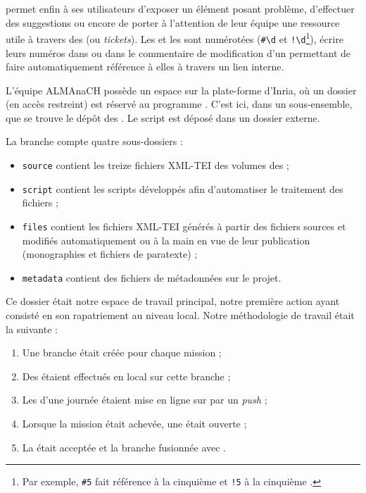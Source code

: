 \gitlab{} permet enfin à ses utilisateurs d'exposer un élément posant problème, d'effectuer des suggestions ou encore de porter à l'attention de leur équipe une ressource utile à travers des \issues{} (ou \textit{tickets}). Les \issues{} et les \mergerequests{} sont numérotées (\texttt{\#\textbackslash d} et \texttt{!\textbackslash d}\footnote{Par exemple, \texttt{\#5} fait référence à la cinquième \issue{} et \texttt{!5} à la cinquième \mergerequest{}.}), écrire leurs numéros dans \gitlab{} ou dans le commentaire de modification d'un \commit{} permettant de faire automatiquement référence à elles à travers un lien interne.

L'équipe ALMAnaCH possède un espace sur la plate-forme \gitlab{} d'Inria, où un dossier (en accès restreint) est réservé au programme \timeus{}. C'est ici, dans un sous-ensemble, que se trouve le dépôt des \odm. Le script \lse{} est déposé dans un dossier externe.

La branche \master{} compte quatre sous-dossiers :

\begin{itemize}
    \item \texttt{source} contient les treize fichiers XML-TEI des volumes des \odm{} ;
    \item \texttt{script} contient les scripts développés afin d'automatiser le traitement des fichiers ;
    \item \texttt{files} contient les fichiers XML-TEI générés à partir des fichiers sources et modifiés automatiquement ou à la main en vue de leur publication (monographies et fichiers de paratexte) ;
    \item \texttt{metadata} contient des fichiers de métadonnées sur le projet.
\end{itemize}

Ce dossier était notre espace de travail principal, notre première action ayant consisté en son rapatriement au niveau local. Notre méthodologie de travail était la suivante :

\begin{enumerate}
    \item Une branche était créée pour chaque mission ;
    \item Des \commits{} étaient effectués en local sur cette branche ;
    \item Les \commits{} d'une journée étaient mise en ligne sur \gitlab{} par un \textit{push} ;
    \item Lorsque la mission était achevée, une \mergerequest{} était ouverte ;
    \item La \mergerequest{} était acceptée et la branche fusionnée avec \master.
\end{enumerate}

